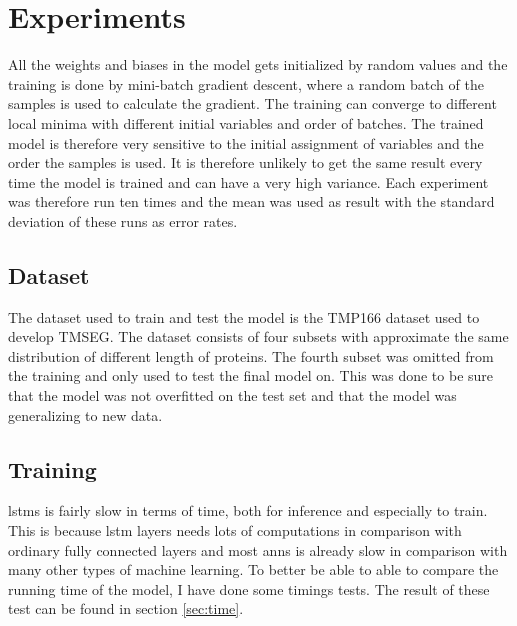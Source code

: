 \section{Experiments}
	

	


All the weights and biases in the model gets initialized by random values and the training
is done by mini-batch gradient descent, where a random batch of the samples is used to 
calculate the gradient. The training can converge to different local minima with 
different initial variables and order of batches.
The trained model is therefore very sensitive to the initial assignment of 
variables and the order the samples is used. It is therefore unlikely to get the same 
result every time the model is trained and can have a very high variance. 
Each experiment was therefore run ten times and the mean was used as result with 
the standard deviation of these runs as error rates.


\subsection{Dataset}
The dataset used to train and test the model is the TMP166\cite{tmseg} dataset used to 
develop TMSEG. The dataset consists of four subsets with approximate the same distribution 
of different length of proteins. The fourth subset was omitted from the training and only 
used to test the final model on. This was done to be sure that the model was not overfitted
on the test set and that the model was generalizing to new data. 

\subsection{Training}
\glspl{lstm} is fairly slow in terms of time, both for inference and especially to train.
This is because \gls{lstm} layers needs lots of computations in comparison with ordinary 
fully connected layers and most \glspl{ann} is already slow in comparison with many 
other types of machine learning.
To better be able to able to compare the running time of the model, I have done 
some timings tests. The result of these test can be found in section \ref{sec:time}.

